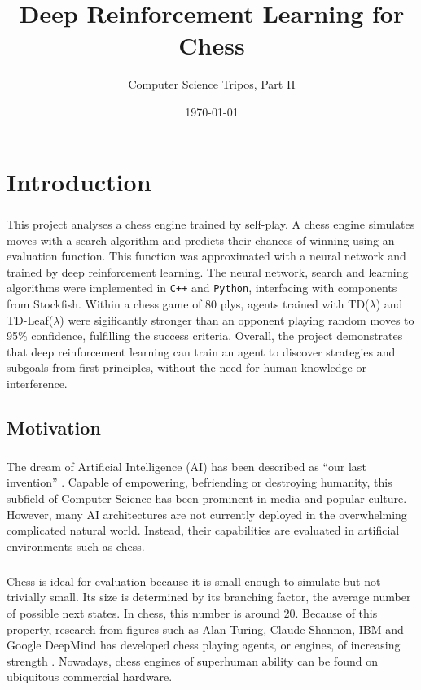 \documentclass[12pt,a4paper]{book}
\title{Deep Reinforcement Learning for Chess}
\date{\today}
\author{Computer Science Tripos, Part II}
\begin{document}
\chapter{Introduction}

\paragraph{} This project analyses a chess engine trained by self-play. A chess engine simulates moves with a search algorithm and predicts their chances of winning using an evaluation function. This function was approximated with a neural network and trained by deep reinforcement learning. The neural network, search and learning algorithms were implemented in \texttt{C++} and \texttt{Python}, interfacing with components from Stockfish. Within a chess game of 80 plys, agents trained with TD($\lambda$) and TD-Leaf($\lambda$) were sigificantly stronger than an opponent playing random moves to 95\% confidence, fulfilling the success criteria. Overall, the project demonstrates that deep reinforcement learning can train an agent to discover strategies and subgoals from first principles, without the need for human knowledge or interference.

\section{Motivation}

\paragraph{} The dream of Artificial Intelligence (AI) has been described as ``our last invention'' \cite{ailast}. Capable of empowering, befriending or destroying humanity, this subfield of Computer Science has been prominent in media and popular culture. However, many AI architectures are not currently deployed in the overwhelming complicated natural world. Instead, their capabilities are evaluated in artificial environments such as chess.

\paragraph{} Chess is ideal for evaluation because it is small enough to simulate but not trivially small. Its size is determined by its branching factor, the average number of possible next states. In chess, this number is around 20. Because of this property, research from figures such as Alan Turing, Claude Shannon, IBM and Google DeepMind has developed chess playing agents, or engines, of increasing strength \cite{michieIntel} \cite{shannonlegendary} \cite{deepBlue} \cite{alphazero}. Nowadays, chess engines of superhuman ability can be found on ubiquitous commercial hardware.
\end{document}
